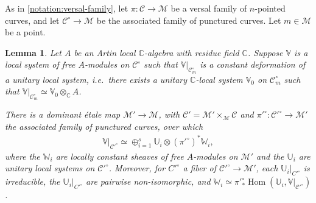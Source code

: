 \documentclass[12 pt]{amsart}
\theoremstyle{plain}
\newtheorem{lemma}[subsubsection]{Lemma}
\theoremstyle{definition}
\theoremstyle{remark}
\numberwithin{equation}{section}
\DeclareMathOperator\Hom{Hom}
\begin{document}
As in \autoref{notation:versal-family}, let $\pi: \mathscr{C}\to \mathscr{M}$ be a versal family of $n$-pointed curves, and let $\mathscr{C}^\circ\to \mathscr{M}$ be the associated family of punctured curves. Let $m\in\mathscr{M}$ be a point.

\begin{lemma}
	\label{lemma:unitary-direct-sum}
	Let $A$ be an Artin local $\mathbb{C}$-algebra with residue field $\mathbb{C}$.
	Suppose $\mathbb V$ is a local system of free $A$-modules on $\mathscr C^\circ$
	such that $\mathbb V|_{\mathscr C^\circ_m}$ is a constant deformation of a unitary local system, i.e.~there exists a unitary $\mathbb{C}$-local system $\mathbb{V}_0$ on $\mathscr C^\circ_m$ such that $\mathbb V|_{\mathscr C^\circ_m}\simeq \mathbb{V}_0\otimes_\mathbb{C} A$.  
	
	There is a dominant \'etale map $\mathscr M' \to \mathscr M$, with $\mathscr{C}'=\mathscr{M}'\times_\mathscr{M}\mathscr{C}$ and ${\pi'}^\circ: {\mathscr{C}'}^\circ\to \mathscr{M}'$  the associated family of punctured curves, over
	which 
	\begin{align*}
	\mathbb V|_{ {\mathscr{C}'}^\circ} \simeq \oplus_{i=1}^s \mathbb U_i
\otimes ({\pi'}^\circ)^* \mathbb
W_i,
	\end{align*}
where the $\mathbb W_i$ are locally constant sheaves of free $A$-modules on $\mathscr M'$ and
	the $\mathbb U_i$ are unitary local systems on ${\mathscr{C}'}^\circ$.
	Moreover, for $C'^\circ$ a fiber of $\mathscr{C}'^\circ \to
	\mathscr{M}'$, each $\mathbb{U}_i|_{C'^\circ}$ is irreducible, the
	$\mathbb{U}_i|_{C'^\circ}$ are pairwise non-isomorphic,
	and $\mathbb W_i \simeq {\pi'}^\circ_*\Hom(\mathbb U_i, \mathbb V|_{ {\mathscr{C}'}^\circ} )$.
\end{lemma}
\end{document}
